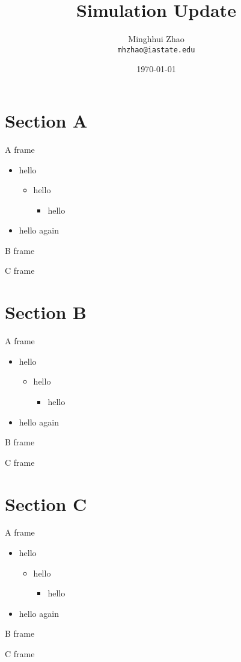 \documentclass{beamer}
\title{Simulation Update}
\institute{ISU \& BNL}
\date[]{\today}
\author[M.H Zhao]{Minghhui Zhao\\\texttt{mhzhao@iastate.edu}}
\begin{document}
\begin{frame}
\titlepage
\end{frame}

\section{Section A}
\begin{frame}{A frame}
\begin{itemize}
\item hello
\begin{itemize}
\item hello
\begin{itemize}
\item hello
\end{itemize}
\end{itemize}
\item hello again
\end{itemize}
\end{frame}
\begin{frame}{B frame}
\end{frame}
\begin{frame}{C frame}
\end{frame}

\section{Section B}
\begin{frame}{A frame}
\begin{itemize}
\item hello
\begin{itemize}
\item hello
\begin{itemize}
\item hello
\end{itemize}
\end{itemize}
\item hello again
\end{itemize}
\end{frame}
\begin{frame}{B frame}
\end{frame}
\begin{frame}{C frame}
\end{frame}

\section{Section C}
\begin{frame}{A frame}
\begin{itemize}
\item hello
\begin{itemize}
\item hello
\begin{itemize}
\item hello
\end{itemize}
\end{itemize}
\item hello again
\end{itemize}
\end{frame}
\begin{frame}{B frame}
\end{frame}
\begin{frame}{C frame}
\end{frame}
\end{document}
